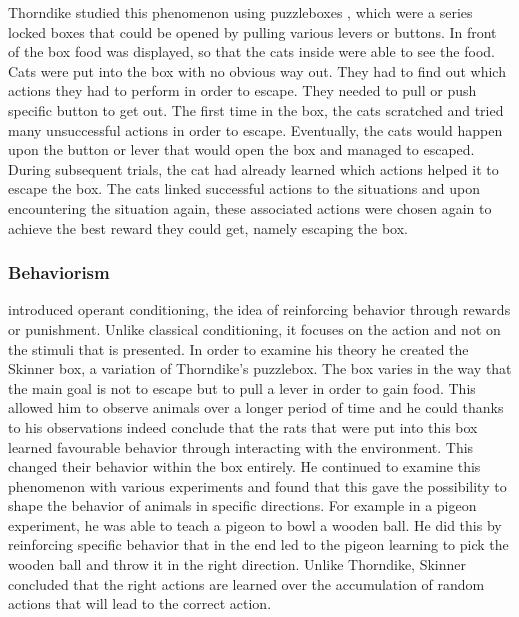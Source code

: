 Thorndike studied this phenomenon using puzzleboxes \citep[pp.8-30]{thorndike1898animal}, which were a series locked boxes that could be opened by pulling various levers or buttons. In front of the box food was displayed, so that the cats inside were able to see the food. Cats were put into the box with no obvious way out. They had to find out which actions they had to perform in order to escape. They needed to pull or push specific button to get out.
The first time in the box, the cats scratched and tried many unsuccessful actions in order to escape. Eventually, the cats would happen upon the button or lever that would open the box and managed to escaped. During subsequent trials, the cat had already learned which actions helped it to escape the box.
The cats linked successful actions to the situations and upon encountering the situation again, these associated actions were chosen again to achieve the best reward they could get, namely escaping the box. 


\subsubsection{Behaviorism}
\cite{skinner1963operant} introduced operant conditioning, the idea of reinforcing behavior through rewards or punishment. Unlike classical conditioning, it focuses on the action and not on the stimuli that is presented. In order to examine his theory he created the Skinner box, a variation of Thorndike's puzzlebox. The box varies in the way that the main goal is not to escape but to pull a lever in order to gain food. This allowed him to observe animals over a longer period of time and he could thanks to his observations indeed conclude that the rats that were put into this box learned favourable behavior through interacting with the environment. This changed their behavior within the box entirely.   
He continued to examine this phenomenon with various experiments and found that this gave the possibility to shape the behavior of animals in specific directions. For example in a pigeon experiment, he was able to teach a pigeon to bowl a wooden ball. He did this by reinforcing specific behavior that in the end led to the pigeon learning to pick the wooden ball and throw it in the right direction. Unlike Thorndike, Skinner concluded that the right actions are learned over the accumulation of random actions that will lead to the correct action. 

